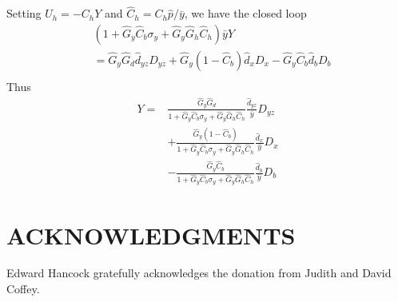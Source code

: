\documentclass[letterpaper, 10 pt,  conference]{ieeeconf}  %
\begin{document}
Setting $U_h=-C_hY$ and $\hat{C}_h=C_h\hat{p}/\bar{y}$, we have the closed loop
\begin{equation*}
\begin{aligned}
&(1+\hat G_y\hat C_b\sigma_y+\hat G_y\hat G_h\hat{C}_h)\bar{y}Y\\
&=\hat G_y\hat G_d\hat d_{yz}D_{yz}+\hat G_y(1-\hat{C}_b)\hat d_xD_x-\hat G_y\hat C_b\hat d_bD_b\\
\end{aligned}
\end{equation*}
Thus
\begin{equation*}
\begin{aligned}
Y=&\frac{\hat G_y\hat G_d}{1+\hat G_y\hat C_b\sigma_y+\hat G_y\hat G_h\hat C_h}\frac{\hat d_{yz}}{\bar{y}}D_{yz}\\
&+\frac{\hat G_y(1-\hat C_b)}{1+\hat G_y\hat C_b\sigma_y+\hat G_y\hat G_h\hat C_h}\frac{\hat d_x}{\bar{y}}D_x\\
&-\frac{\hat G_y\hat C_b}{1+\hat G_y\hat C_b\sigma_y+\hat G_y\hat G_h\hat C_h}\frac{\hat d_b}{\bar{y}}D_b
\end{aligned}
\end{equation*}

















\section*{ACKNOWLEDGMENTS}

Edward Hancock gratefully acknowledges the donation from Judith and David Coffey. 



\end{document}
